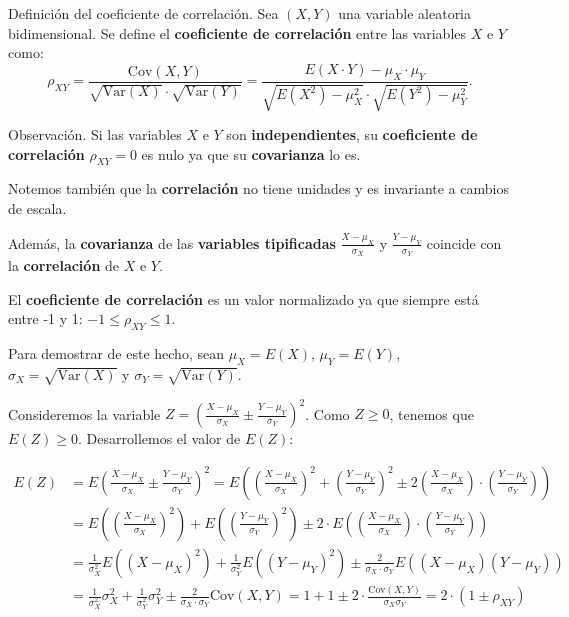 \documentclass[
  letterpaper,
  DIV=11,
  numbers=noendperiod]{scrreprt}
\begin{document}
Definición del coeficiente de correlación. Sea \((X,Y)\) una variable
aleatoria bidimensional. Se define el \textbf{coeficiente de
correlación} entre las variables \(X\) e \(Y\) como: \[
\rho_{XY}=\frac{\mathrm{Cov}(X,Y)}{\sqrt{\mathrm{Var}(X)}\cdot\sqrt{\mathrm{Var}(Y)}}=\frac{E(X\cdot Y)-\mu_X\cdot \mu_Y}{\sqrt{E\left(X^2\right)-\mu_X^2}\cdot \sqrt{E\left(Y^2\right)-\mu_Y^2}}.
\]

Observación. Si las variables \(X\) e \(Y\) son \textbf{independientes},
su \textbf{coeficiente de correlación} \(\rho_{XY}=0\) es nulo ya que su
\textbf{covarianza} lo es.

Notemos también que la \textbf{correlación} no tiene unidades y es
invariante a cambios de escala.

Además, la \textbf{covarianza} de las \textbf{variables tipificadas}
\(\frac{X-\mu_X}{\sigma_X}\) y \(\frac{Y-\mu_Y}{\sigma_Y}\) coincide con
la \textbf{correlación} de \(X\) e \(Y\).

El \textbf{coeficiente de correlación} es un valor normalizado ya que
siempre está entre -1 y 1: \(-1\leq\rho_{XY}\leq 1\).

Para demostrar de este hecho, sean \(\mu_X=E(X)\), \(\mu_Y=E(Y)\),
\(\sigma_X=\sqrt{\mathrm{Var}(X)}\) y
\(\sigma_Y=\sqrt{\mathrm{Var}(Y)}\).

Consideremos la variable
\(Z=\left(\frac{X-\mu_X}{\sigma_X}\pm \frac{Y-\mu_Y}{\sigma_Y}\right)^2\).
Como \(Z\geq 0\), tenemos que \(E(Z)\geq 0\). Desarrollemos el valor de
\(E(Z)\):

\[
\begin{array}{rl}
E(Z) & = E\left(\frac{X-\mu_X}{\sigma_X}\pm \frac{Y-\mu_Y}{\sigma_Y}\right)^2 = E\left(\left(\frac{X-\mu_X}{\sigma_X}\right)^2+\left(\frac{Y-\mu_Y}{\sigma_Y}\right)^2\pm 2\left(\frac{X-\mu_X}{\sigma_X}\right)\cdot  \left(\frac{Y-\mu_Y}{\sigma_Y}\right)\right) \\ & =
E\left(\left(\frac{X-\mu_X}{\sigma_X}\right)^2\right)+E\left(\left(\frac{Y-\mu_Y}{\sigma_Y}\right)^2\right)\pm 2\cdot  E\left(\left(\frac{X-\mu_X}{\sigma_X}\right) \cdot \left(\frac{Y-\mu_Y}{\sigma_Y}\right)\right) \\ & =
\frac{1}{\sigma_X^2}E\left(\left(X-\mu_X\right)^2\right)+\frac{1}{\sigma_Y^2}E\left(\left(Y-\mu_Y\right)^2\right)\pm \frac{2}{\sigma_X\cdot \sigma_Y}E\left(\left(X-\mu_X\right) \left(Y-\mu_Y\right)\right) \\ & = \frac{1}{\sigma_X^2}\sigma_X^2+
\frac{1}{\sigma_Y^2}\sigma_Y^2 \pm\frac{2}{\sigma_X\cdot \sigma_Y} \mathrm{Cov}(X,Y) = 1+1\pm 2\cdot \frac{\mathrm{Cov}(X,Y)}{\sigma_X\sigma_Y}=2\cdot (1\pm\rho_{XY})
\end{array}
\]
\end{document}
